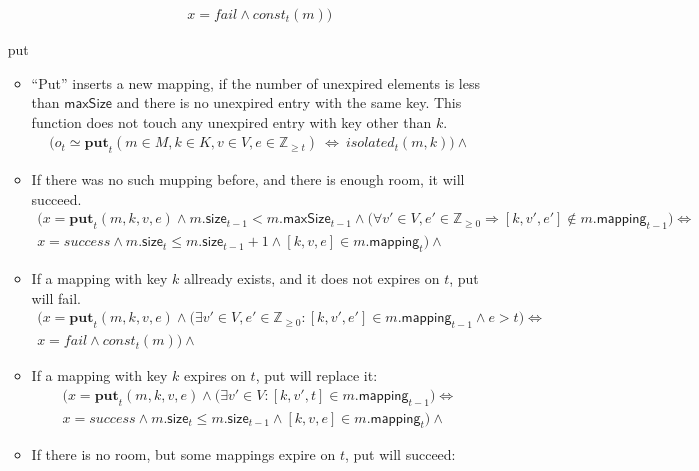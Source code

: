 \documentclass{article}
\renewcommand{\o}[1]{\ensuremath{\mathbf{#1}}}
\newcommand{\p}[1]{\ensuremath{\mathit{#1}}}
\newcommand{\s}[1]{\ensuremath{\mathsf{#1}}}
\newcommand{\nintset}{\ensuremath{\mathds{Z}_{\ge 0}}}
\newcommand{\moreset}[1]{\ensuremath{\mathds{Z}_{\ge #1}}}
\begin{document}
\begin{itemize}
\begin{itemize}
\begin{gather}
      x=fail \wedge \p{const}_t(m)\Big)
      \label{eq:erase2}
    \end{gather}
  \end{itemize}
\item[put]
  \begin{itemize}
  \item ``Put'' inserts a new mapping, if the number of unexpired elements is less than \s{maxSize} and there is no unexpired entry with the same key.
    This function does not touch any unexpired entry with key other than $k$.
    \begin{gather*}
      \Big(o_t \simeq \o{put}_t(m\in M, k\in K, v\in V, e\in \moreset{t}) ~\Leftrightarrow~ \p{isolated}_t(m, k)\Big) \wedge
    \end{gather*}
  \item If there was no such mupping before, and there is enough room, it will succeed.
    \begin{gather}
      \Big(x=\o{put}_t(m, k, v, e) \wedge m.\s{size}_{t-1} < m.\s{maxSize}_{t-1} \wedge \big(\forall v'\in V, e'\in \nintset \Rightarrow [k, v', e'] \not\in m.\s{mapping}_{t-1}\big) \Leftrightarrow \nonumber\\
      x=success \wedge m.\s{size}_t \le m.\s{size}_{t-1}+1 \wedge [k, v, e] \in m.\s{mapping}_t\Big)\wedge
      \label{eq:put1}
    \end{gather}
  \item If a mapping with key $k$ allready exists, and it does not expires on $t$, put will fail.
    \begin{gather}
      \Big(x=\o{put}_t(m, k, v, e) \wedge \big(\exists v'\in V, e'\in \nintset: [k, v', e']\in m.\s{mapping}_{t-1} \wedge e > t \big) \Leftrightarrow\nonumber\\
      x=fail \wedge \p{const}_t(m)\Big)\wedge
      \label{eq:put2}
    \end{gather}
  \item If a mapping with key $k$ expires on $t$, put will replace it:
    \begin{gather}
      \Big(x=\o{put}_t(m, k, v, e) \wedge \big(\exists v'\in V: [k, v', t]\in m.\s{mapping}_{t-1}\big) \Leftrightarrow\nonumber\\
      x=success \wedge m.\s{size}_t \le m.\s{size}_{t-1} \wedge [k, v, e] \in m.\s{mapping}_t\Big)\wedge
      \label{eq:put3}
    \end{gather}
  \item If there is no room, but some mappings expire on $t$, put will succeed:
    \begin{gather}

\end{gather}
\end{itemize}
\end{itemize}
\end{document}
